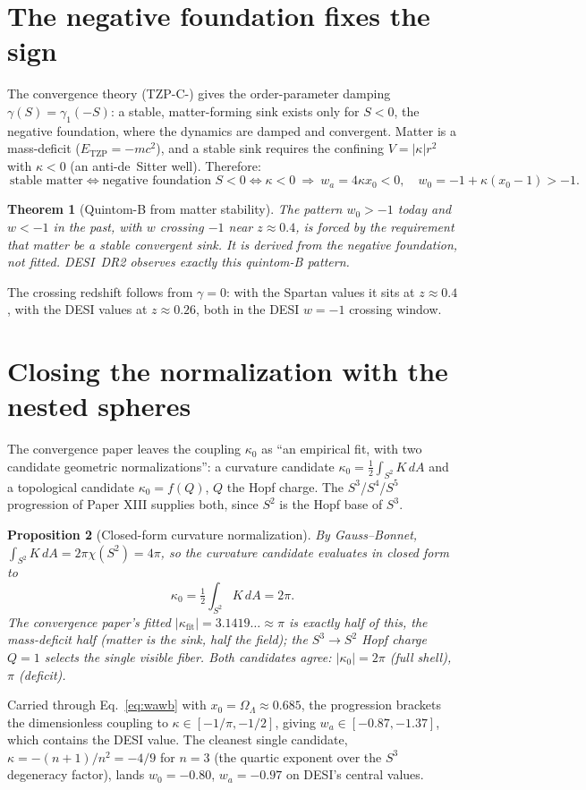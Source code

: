 \documentclass[11pt]{article}
\newtheorem{theorem}{Theorem}[section]
\newtheorem{proposition}[theorem]{Proposition}
\theoremstyle{remark}
\newcommand{\OmL}{\Omega_\Lambda}
\begin{document}
\section{The negative foundation fixes the sign}
\label{sec:sign}
The convergence theory (TZP-C-) gives the order-parameter damping $\gamma(S) = \gamma_1(-S)$: a stable, matter-forming sink exists only for $S < 0$, the negative foundation, where the dynamics are damped and convergent. Matter is a mass-deficit ($E_{\mathrm{TZP}} = -mc^2$), and a stable sink requires the confining $V = |\kappa|r^2$ with $\kappa < 0$ (an anti-de~Sitter well). Therefore:
\begin{equation}
\boxed{\ \text{stable matter} \iff \text{negative foundation } S<0 \iff \kappa < 0 \ \Rightarrow\ w_a = 4\kappa x_0 < 0,\quad w_0 = -1+\kappa(x_0-1) > -1.\ }
\end{equation}
\begin{theorem}[Quintom-B from matter stability]
\label{thm:quintom}
The pattern $w_0 > -1$ today and $w < -1$ in the past, with $w$ crossing $-1$ near $z \approx 0.4$, is forced by the requirement that matter be a stable convergent sink. It is derived from the negative foundation, not fitted. DESI~DR2 observes exactly this quintom-B pattern.
\end{theorem}
The crossing redshift follows from $\gamma = 0$: with the Spartan values it sits at $z \approx 0.4$, with the DESI values at $z \approx 0.26$, both in the DESI $w = -1$ crossing window.

\section{Closing the normalization with the nested spheres}
\label{sec:normalization}
The convergence paper leaves the coupling $\kappa_0$ as ``an empirical fit, with two candidate geometric normalizations'': a curvature candidate $\kappa_0 = \tfrac{1}{2}\int_{S^2}K\,dA$ and a topological candidate $\kappa_0 = f(Q)$, $Q$ the Hopf charge. The $S^3$/$S^4$/$S^5$ progression of Paper XIII supplies both, since $S^2$ is the Hopf base of $S^3$.
\begin{proposition}[Closed-form curvature normalization]
\label{prop:gaussbonnet}
By Gauss--Bonnet, $\int_{S^2}K\,dA = 2\pi\chi(S^2) = 4\pi$, so the curvature candidate evaluates in closed form to
\begin{equation}
\kappa_0 = \tfrac{1}{2}\int_{S^2}K\,dA = 2\pi.
\end{equation}
The convergence paper's fitted $|\kappa_{\mathrm{fit}}| = 3.1419\ldots \approx \pi$ is exactly half of this, the mass-deficit half (matter is the sink, half the field); the $S^3 \to S^2$ Hopf charge $Q = 1$ selects the single visible fiber. Both candidates agree: $|\kappa_0| = 2\pi$ (full shell), $\pi$ (deficit).
\end{proposition}
Carried through Eq.~\eqref{eq:wawb} with $x_0 = \OmL \approx 0.685$, the progression brackets the dimensionless coupling to $\kappa \in [-1/\pi, -1/2]$, giving $w_a \in [-0.87, -1.37]$, which contains the DESI value. The cleanest single candidate, $\kappa = -(n+1)/n^2 = -4/9$ for $n = 3$ (the quartic exponent over the $S^3$ degeneracy factor), lands $w_0 = -0.80$, $w_a = -0.97$ on DESI's central values.
\end{document}
